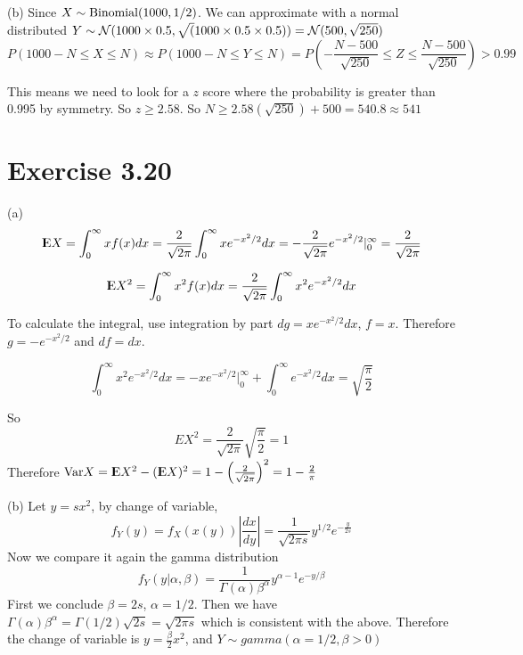 \documentclass[12pt]{article}
\begin{document}
(b) Since $X \sim \mathrm{Binomial} (1000, 1/2)$. We can approximate with a normal distributed $Y \sim \mathcal{N} (1000 \times 0.5, \sqrt(1000 \times 0.5 \times 0.5)) = \mathcal{N} (500, \sqrt{250})$
$$ P(1000- N \leq X \leq N) \approx P( 1000 - N \leq Y \leq N) = P(- \frac{N - 500}{\sqrt{250}} \leq Z \leq \frac{N - 500}{\sqrt{250}}) > 0.99$$

This means we need to look for a $z$ score where the probability is greater than 0.995 by symmetry. So $z \geq 2.58$. So $N \geq 2.58 (\sqrt{250}) + 500 = 540.8 \approx 541$

\section*{Exercise 3.20}
(a) $$ {\rm I\kern-.3em E} X = \int^{\infty}_{0} xf(x) dx = \frac{2}{\sqrt{2\pi}} \int^{\infty}_{0} x e^{-x^2/2} dx
 = - \frac{2}{\sqrt{2\pi}} e^{-x^2/2} |^{\infty}_{0} =  \frac{2}{\sqrt{2\pi}}$$
 
 $${\rm I\kern-.3em E} X^2 = \int^{\infty}_{0} x^2f(x) dx =  \frac{2}{\sqrt{2\pi}} \int^{\infty}_{0} x^2 e^{-x^2/2} dx$$
 
To calculate the integral, use integration by part $dg = x e^{-x^2/2}dx$, $f = x$. Therefore $g = -e^{-x^2/2}$ and $df=dx$. 

$$\int^{\infty}_{0} x^2 e^{-x^2/2} dx = -xe^{-x^2/2}|^{\infty}_{0} + \int^{\infty}_{0} e^{-x^2/2} dx = \sqrt{\frac{\pi}{2}}$$

So $$EX^2 = \frac{2}{\sqrt{2\pi}}  \sqrt{\frac{\pi}{2}} = 1$$
Therefore $\mathrm{Var} X = {\rm I\kern-.3em E} X^2 - ({\rm I\kern-.3em E} X)^2 = 1 - \left( \frac{2}{\sqrt{2\pi}}\right)^2 = 1 - \frac{2}{\pi}$ 

(b) Let $y=sx^2$, by change of variable,
$$ f_Y(y) = f_X(x(y)) \left| \frac{dx}{dy} \right| = \frac{1}{\sqrt{2\pi s}} y^{1/2} e^{-\frac{y}{2s}}$$
Now we compare it again the gamma distribution $$ f_Y(y|\alpha, \beta) = \frac{1}{\Gamma(\alpha)\beta^{\alpha}} y^{\alpha - 1} e^{-y/\beta}$$
First we conclude $\beta = 2s$, $\alpha = 1/2$. Then we have $\Gamma(\alpha)\beta^{\alpha} = \Gamma(1/2)\sqrt{2s} = \sqrt{2\pi s}$ which is consistent with the above. Therefore the change of variable is $y = \frac{\beta}{2} x^2$, and $Y \sim gamma(\alpha=1/2, \beta > 0)$
\end{document}
